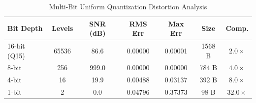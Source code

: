 \begin{table}[t]
\centering
\scriptsize
\setlength{\tabcolsep}{3.2pt}
\renewcommand{\arraystretch}{0.85}
\caption{Multi-Bit Uniform Quantization Distortion Analysis}
\label{tab:quantization}
\begin{tabular}{lcccccc}
\toprule
\textbf{Bit Depth} & \textbf{Levels} & \textbf{SNR (dB)} & \textbf{RMS Err} & \textbf{Max Err} & \textbf{Size} & \textbf{Comp.} \\
\midrule
16-bit (Q15) & 65536 & 86.6  & 0.00000 & 0.00001 & 1568 B & $2.0\times$ \\
8-bit        & 256   & 999.0 & 0.00000 & 0.00000 & 784 B & $4.0\times$ \\
4-bit        & 16    & 19.9  & 0.00488 & 0.03137 & 392 B & $8.0\times$ \\
1-bit        & 2     & 0.0   & 0.04796 & 0.37373 & 98 B & $32.0\times$ \\
\bottomrule
\end{tabular}
\end{table}
